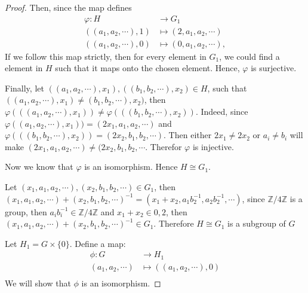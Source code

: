 \begin{answer}
\begin{proof}
        Then, since the map defines
        \begin{equation}
            \begin{aligned}
                    \varphi: H &\to G_1\\
                    ((a_1,a_2,\cdots),1) &\mapsto (2,a_1,a_2,\cdots)\\
                    ((a_1,a_2,\cdots),0) &\mapsto (0,a_1,a_2,\cdots),
            \end{aligned}
        \end{equation}
        If we follow this map strictly, then for every element in $G_1$, we could find a element in $H$ such that it maps onto the chosen element. Hence, $\varphi$ is surjective.
        
        Finally, let $((a_1,a_2,\cdots),x_1), ((b_1,b_2,\cdots),x_2) \in H$, such that $((a_1,a_2,\cdots),x_1)\neq(b_1,b_2,\cdots),x_2)$, then $\varphi(((a_1,a_2,\cdots),x_1)) \neq \varphi(((b_1,b_2,\cdots),x_2))$. Indeed, since $\varphi((a_1,a_2,\cdots),x_1)) = (2x_1,a_1,a_2,\cdots)$ and $\varphi(((b_1,b_2,\cdots),x_2)) = (2x_2,b_1,b_2,\cdots)$. Then either $2x_1\neq 2x_2$ or $a_i \neq b_i$ will make $(2x_1,a_1,a_2,\cdots) \neq (2x_2,b_1,b_2,\cdots$. Therefor $\varphi$ is injective.
        
        Now we know that $\varphi$ is an isomorphism. Hence $H \cong G_1$.
        
        Let $(x_1,a_1,a_2,\cdots),(x_2,b_1,b_2,\cdots) \in G_1$, then $(x_1,a_1,a_2,\cdots)+(x_2,b_1,b_2,\cdots)^{-1} = (x_1+x_2,a_1b_2^{-1},a_2b_2^{-1},\cdots)$, since $\mathbb{Z}/4\mathbb{Z}$ is a group, then $a_ib_i^{-1} \in \mathbb{Z}/4\mathbb{Z}$ and $x_1+x_2 \in {0,2}$, then $(x_1,a_1,a_2,\cdots)+(x_2,b_1,b_2,\cdots)^{-1} \in G_1$. Therefore $H \cong G_1$ is a subgroup of $G$
        
        Let $H_1 = G \times \{0\}$. Define a map:
        \begin{equation}
            \begin{aligned}
                \phi: G &\to H_1\\
                (a_1,a_2,\cdots) &\mapsto ((a_1,a_2,\cdots),0)\\
            \end{aligned}
        \end{equation}
        We will show that $\phi$ is an isomorphism.
        

\end{proof}
\end{answer}
